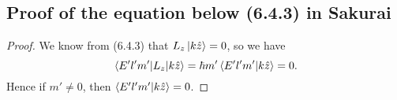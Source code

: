 \documentclass[10pt]{article}
\begin{document}
	\subsection{Proof of the equation below (6.4.3) in Sakurai}
	\begin{proof}
		We know from (6.4.3) that $L_z \ket{k\hat{z}} = 0$, so we have
		\begin{equation}
			\mel{E'l'm'}{L_z}{k \hat{z}} = \hbar m' \braket{E'l'm'}{k\hat{z}} = 0.
		\end{equation}
		Hence if $m' \neq 0$, then $\braket{E'l'm'}{k\hat{z}} = 0$.
	\end{proof}
\end{document}
